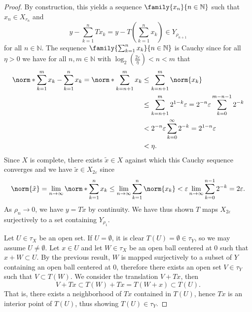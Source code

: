 \begin{proof}
    By construction, this yields a sequence \(\family{x_n}{n \in \mathbb{N}}\) such that \(x_n \in X_{r_n}\) and
    \begin{equation*}
        y - \sum_{k=1}^{n} Tx_k = y - T\left(\sum_{k=1}^{n} x_k\right)\in Y_{\rho_{n+1}}
    \end{equation*}
    for all \(n \in \mathbb{N}\). The sequence \(\family{\sum_{k = 1}^n x_k}{n\in \mathbb{N}}\) is Cauchy since for all \(\eta > 0\) we have for all \(n,m \in \mathbb{N}\) with \(\log_2\left(\frac{2 \varepsilon}{\eta}\right) < n < m\) that
    \begin{align*}
        \norm*{\sum_{k=1}^m x_k - \sum_{k=1}^n x_k} = \norm*{\sum_{k=n+1}^{m} x_k} &\leq \sum_{k=n+1}^m \norm{x_k}\\
                                                                                   &\leq \sum_{k=n+1}^{m} 2^{1-k}\varepsilon = 2^{-n} \varepsilon\sum_{k=0}^{m-n-1} 2^{-k}\\
                                                                                   &< 2^{-n} \varepsilon \sum_{k=0}^\infty 2^{-k} = 2^{1-n} \varepsilon\\
                                                                                   &< \eta.
    \end{align*}
    Since \(X\) is complete, there exists \(\tilde{x} \in X\) against which this Cauchy sequence converges and we have \(\tilde{x} \in X_{2 \varepsilon}\) since
    \begin{equation*}
        \norm{\tilde{x}} = \lim_{n\to\infty} \norm*{\sum_{k=1}^n x_k} \leq \lim_{n\to\infty} \sum_{k=1}^n \norm{x_k} < \varepsilon \lim_{n\to\infty} \sum_{k=0}^{n-1} 2^{-k} = 2 \varepsilon.
    \end{equation*}
    As \(\rho_n \to 0\), we have \(y = T\tilde{x}\) by continuity. We have thus shown \(T\) maps \(X_{2 \varepsilon}\) surjectively to a set containing \(Y_{\rho_1}\).

    Let \(U \in \tau_X\) be an open set. If \(U = \emptyset\), it is clear \(T(U) = \emptyset \in \tau_Y\), so we may assume \(U \neq \emptyset\). Let \(x \in U\) and let \(W \in \tau_X\) be an open ball centered at \(0\) such that \(x + W \subset U\). By the previous result, \(W\) is mapped surjectively to a subset of \(Y\) containing an open ball centered at \(0\), therefore there exists an open set \(V \in \tau_Y\) such that \(V \subset T(W)\). We consider the translation \(V + Tx\), then
    \begin{equation*}
        V + Tx \subset T(W) + Tx = T(W + x) \subset T(U).
    \end{equation*}
    That is, there exists a neighborhood of \(Tx\) contained in \(T(U)\), hence \(Tx\) is an interior point of \(T(U)\), thus showing \(T(U) \in \tau_Y\).
\end{proof}

